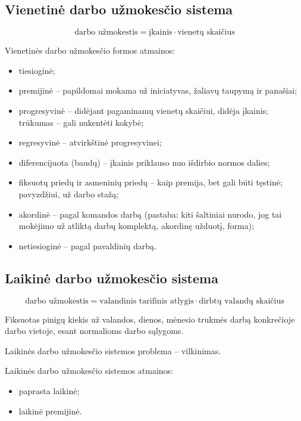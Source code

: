 \subsection{Vienetinė darbo užmokesčio sistema}

\begin{equation*}
  \text{darbo užmokestis} = \text{įkainis} \cdot \text{vienetų skaičius}
\end{equation*}

Vienetinės darbo užmokesčio formos atmainos:
\begin{itemize}
  \item tiesioginė;
  \item premijinė – papildomai mokama už iniciatyvas, žaliavų taupymą ir
    panašiai;
  \item progresyvinė – didėjant pagaminamų vienetų skaičiui, didėja įkainis;
    trūkumas – gali nukentėti kokybė;
  \item regresyvinė – atvirkštinė progresyvinei;
  \item diferencijuota (baudų) – įkainis priklauso nuo išdirbio normos
    dalies;
  \item fiksuotų priedų ir asmeninių priedų – kaip premija, bet gali būti
    tęstinė; pavyzdžiui, už darbo stažą;
  \item akordinė – pagal komandos darbą (pastaba: kiti šaltiniai nurodo, jog
    tai mokėjimo už atliktą darbų komplektą, akordinę užduotį, forma);
  \item netiesioginė – pagal pavaldinių darbą.
\end{itemize}

\subsection{Laikinė darbo užmokesčio sistema}

\begin{equation*}
  \text{darbo užmokestis} =
    \text{valandinis tarifinis atlygis} \cdot \text{dirbtų valandų skaičius}
\end{equation*}

\begin{defn}
  Fiksuotas pinigų kiekis už valandos, dienos, mėnesio trukmės darbą
  konkrečioje darbo vietoje, esant normalioms darbo sąlygoms.
\end{defn}

Laikinės darbo užmokesčio sistemos problema – vilkinimas.

Laikinės darbo užmokesčio sistemos atmainos:
\begin{itemize}
  \item paprasta laikinė;
  \item laikinė premijinė.
\end{itemize}


